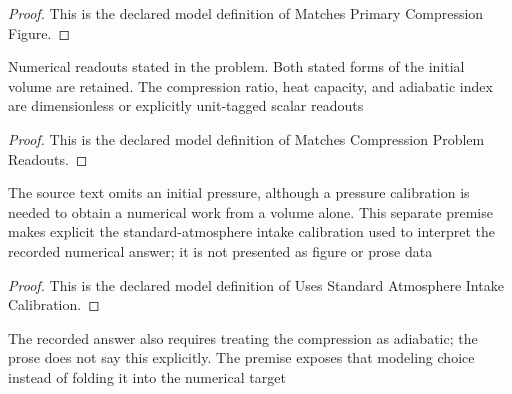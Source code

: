 \begin{proof}
  This is the declared model definition of Matches Primary Compression Figure.
\end{proof}
\begin{definition}
  \label{def:physics:phyx-mini-0472:phyxminiproblems-problemphyxmini0472-matchescompressionproblemreadouts}
  Numerical readouts stated in the problem. Both stated forms of the initial volume are retained. The compression ratio, heat capacity, and adiabatic index are dimensionless or explicitly unit-tagged scalar readouts
\end{definition}
\begin{proof}
  This is the declared model definition of Matches Compression Problem Readouts.
\end{proof}
\begin{definition}
  \label{def:physics:phyx-mini-0472:phyxminiproblems-problemphyxmini0472-usesstandardatmosphereintakecalibration}
  The source text omits an initial pressure, although a pressure calibration is needed to obtain a numerical work from a volume alone. This separate premise makes explicit the standard-atmosphere intake calibration used to interpret the recorded numerical answer; it is not presented as figure or prose data
\end{definition}
\begin{proof}
  This is the declared model definition of Uses Standard Atmosphere Intake Calibration.
\end{proof}
\begin{definition}
  \label{def:physics:phyx-mini-0472:phyxminiproblems-problemphyxmini0472-usesadiabaticcompressionmodel}
  The recorded answer also requires treating the compression as adiabatic; the prose does not say this explicitly. The premise exposes that modeling choice instead of folding it into the numerical target
\end{definition}
